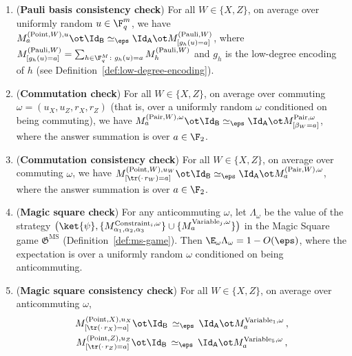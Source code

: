 \begin{lemma}
\begin{enumerate}
		$a \in \F_q \cup \{\bot\}$ described after the item list.
		\item \label{enu:qld-pauli-basis-cons} (\textbf{Pauli basis
		consistency check}) For all $W \in \{X,Z\}$, on average over
		uniformly random $u \in \F_q^m$, we have
		$M^{(\mathrm{Point},W),u}_a \ot \Id_{\mathsf{B}} \simeq_\eps \Id_{\mathsf{A}} \ot M^{(\mathrm{Pauli},W)}_{[g_h(u)=a]}$,
		where
		$M^{(\mathrm{Pauli},W)}_{[g_h(u)=a]} = \sum_{h \in \F_q^{M} \colon g_h(u)=a} M^{(\mathrm{Pauli},W)}_h$
		and $g_h$ is the low-degree encoding of $h$
		(see Definition~\ref{def:low-degree-encoding}).
		\item \label{enu:qld-comm} (\textbf{Commutation check}) For all
		$W \in \{X,Z\}$, on average over commuting
		$\omega = (u_X,u_Z,r_X,r_Z)$ (that is, over a uniformly random
		$\omega$ conditioned on being commuting), we have
		$M^{(\mathrm{Pair},W),\omega}_a \ot \Id_{\mathsf{B}} \simeq_\eps \Id_{\mathsf{A}} \ot M^{\mathrm{Pair},\omega}_{[\beta_W=a]}$,
		where the answer summation is over $a \in \F_2$.
		\item \label{enu:qld-comm-cons} (\textbf{Commutation consistency
		check}) For all $W \in \{X,Z\}$, on average over commuting
		$\omega$, we have
		$M^{(\mathrm{Point},W),u_W}_{[\tr(\cdot\,r_W)=a]} \ot \Id_{\mathsf{B}} \simeq_\eps \Id_{\mathsf{A}} \ot M^{(\mathrm{Pair},W),\omega}_a$,
		where the answer summation is over $a \in \F_2$.
		\item \label{enu:qld-ms} (\textbf{Magic square check}) For any
		anticommuting $\omega$, let $\Lambda_\omega$ be the value of the
		strategy
		$\big( \ket{\psi}, \{M^{\mathrm{Constraint}_i,\omega}_{\alpha_1,\alpha_2,\alpha_3}\} \cup \{M^{\mathrm{Variable}_j,\omega}_a\} \big)$
		in the Magic Square game $\mathfrak{G}^{\mathrm{MS}}$
		(Definition~\ref{def:ms-game}). Then
		$\E_\omega \Lambda_\omega = 1 - O(\eps)$, where the expectation is
		over a uniformly random $\omega$ conditioned on being
		anticommuting.
		\item \label{enu:qld-ms-cons} (\textbf{Magic square consistency
		check}) For all $W \in \{X,Z\}$, on average over anticommuting
		$\omega$,
		\begin{gather*}
			M^{(\mathrm{Point},X),u_X}_{[\tr(\cdot\,r_X)=a]} \ot \Id_{\mathsf{B}} \,\simeq_\eps\, \Id_{\mathsf{A}} \ot M^{\mathrm{Variable}_1,\omega}_a\,,\\
			M^{(\mathrm{Point},Z),u_Z}_{[\tr(\cdot\,r_Z)=a]} \ot \Id_{\mathsf{B}} \,\simeq_\eps\, \Id_{\mathsf{A}} \ot M^{\mathrm{Variable}_5,\omega}_a\,,
		\end{gather*}

\end{enumerate}
\end{lemma}
